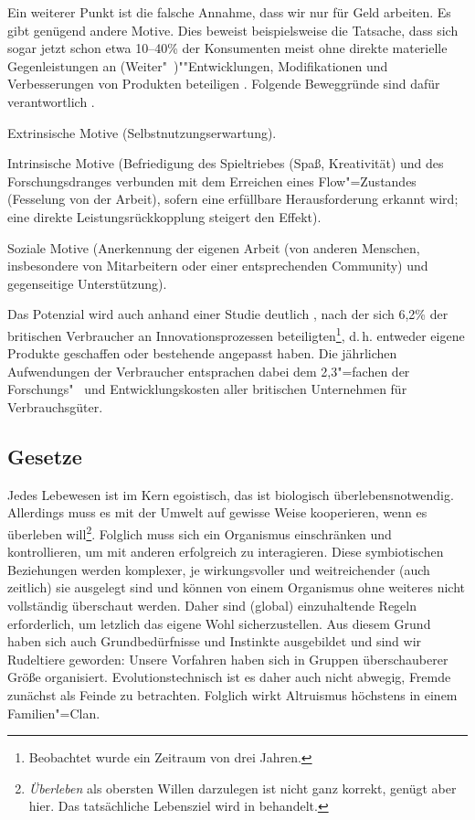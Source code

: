 Ein weiterer Punkt ist die falsche Annahme, dass wir nur für Geld arbeiten. Es gibt genügend andere Motive. Dies beweist beispielsweise die Tatsache, dass sich sogar jetzt schon etwa 10--40\% der Konsumenten meist ohne direkte materielle Gegenleistungen an (Weiter"~)""Entwicklungen, Modifikationen und Verbesserungen von Produkten beteiligen \citep[S.~11]{piller_oi_2006}. Folgende Beweggründe sind dafür verantwortlich \citep[SS.~11--13]{piller_oi_2006}.
\begin{compactitem}
\item Extrinsische Motive (Selbstnutzungserwartung).
\item Intrinsische Motive (Befriedigung des Spieltriebes (Spaß, Kreativität) und des Forschungsdranges verbunden mit dem Erreichen eines Flow"=Zustandes (Fesselung von der Arbeit), sofern eine erfüllbare Herausforderung erkannt wird; eine direkte Leistungsrückkopplung steigert den Effekt).
\item Soziale Motive (Anerkennung der eigenen Arbeit (von anderen Menschen, insbesondere von Mitarbeitern oder einer entsprechenden Community) und gegenseitige Unterstützung).
\end{compactitem}
Das Potenzial wird auch anhand einer Studie deutlich \citep{hippel_2010}, nach der sich 6,2\% der britischen Verbraucher an Innovationsprozessen beteiligten\footnote{Beobachtet wurde ein Zeitraum von drei Jahren.}, d.\,h. entweder eigene Produkte geschaffen oder bestehende angepasst haben. Die jährlichen Aufwendungen der Verbraucher entsprachen dabei dem 2,3"=fachen der Forschungs"~ und Entwicklungskosten aller britischen Unternehmen für Verbrauchsgüter.

\subsection{Gesetze}\label{sec:situation/laws}

Jedes Lebewesen ist im Kern egoistisch, das ist biologisch überlebensnotwendig. Allerdings muss es mit der Umwelt auf gewisse Weise kooperieren, wenn es überleben will\footnote{\textit{Überleben} als obersten Willen darzulegen ist nicht ganz korrekt, genügt aber hier. Das tatsächliche Lebensziel wird in  behandelt.}. Folglich muss sich ein Organismus einschränken und kontrollieren, um mit anderen erfolgreich zu interagieren. Diese symbiotischen Beziehungen werden komplexer, je wirkungsvoller und weitreichender (auch zeitlich) sie ausgelegt sind und können von einem Organismus ohne weiteres nicht vollständig überschaut werden. Daher sind (global) einzuhaltende Regeln erforderlich, um letzlich das eigene Wohl sicherzustellen. Aus diesem Grund haben sich auch Grundbedürfnisse und Instinkte ausgebildet und sind wir Rudeltiere geworden: Unsere Vorfahren haben sich in Gruppen überschauberer Größe organisiert. Evolutionstechnisch ist es daher auch nicht abwegig, Fremde zunächst als Feinde zu betrachten. Folglich wirkt Altruismus höchstens in einem Familien"=Clan.

